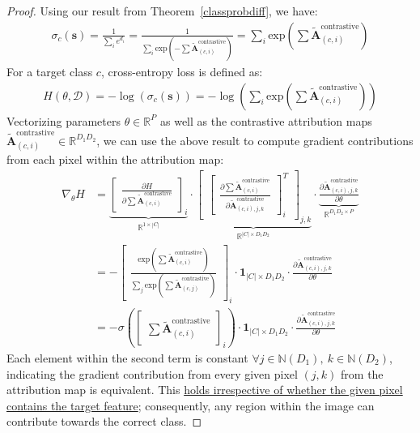 \documentclass{article}
\theoremstyle{plain}
\theoremstyle{definition}
\theoremstyle{remark}
\begin{document}
\begin{proof}
	Using our result from Theorem~\ref{classprobdiff}, we have:
	\begin{gather}
		\sigma_c(\bm{s}) = \frac{1}{\sum_i e^{d_i}} = \frac{1}{\sum_i \text{exp}({-\sum \tilde{\mathcal{\bm{A}}}^{\text{contrastive}}_{(c, i)}})} = \sum_i \text{exp}\left({\sum \tilde{\mathcal{\bm{A}}}^{\text{contrastive}}_{(c, i)}}\right)
	\end{gather}
	For a target class $c$, cross-entropy loss is defined as:
	\begin{gather}
		H(\theta, \mathcal{D}) = -\log \left( \sigma_c(\bm{s}) \right) = -\log \left( \sum_i \text{exp}\left({\sum \tilde{\mathcal{\bm{A}}}^{\text{contrastive}}_{(c, i)}}\right) \right)
	\end{gather}
	Vectorizing parameters $\theta \in \mathbb{R}^P$ as well as the contrastive attribution maps $\tilde{\mathcal{\bm{A}}}_{(c, i)}^{\text{contrastive}} \in \mathbb{R}^{D_1 D_2}$, we can use the above result to compute gradient contributions from each pixel within the attribution map:
	\begin{align}
		\nabla_\theta H &= \underbrace{\begin{bmatrix} \frac{\partial H}{\partial \sum \tilde{\mathcal{\bm{A}}}_{(c, i)}^{\text{contrastive}}} \end{bmatrix}_i}_{\mathbb{R}^{1 \times |C|}}
			\cdot \underbrace{\begin{bmatrix} \begin{bmatrix} \frac{\partial \sum \tilde{\mathcal{\bm{A}}}_{(c, i)}^{\text{contrastive}}}{\partial \tilde{\mathcal{\bm{A}}}_{(c, i), j, k}^{\text{contrastive}}} \end{bmatrix}_{i}^T \end{bmatrix}_{j,k}}_{\mathbb{R}^{|C| \times D_1 D_2}}
			\cdot \underbrace{\frac{\partial \tilde{\mathcal{\bm{A}}}_{(c, i), j, k}^{\text{contrastive}}}{\partial \theta}}_{\mathbb{R}^{D_1D_2 \times P}} \\
		&= - \begin{bmatrix} \frac{\text{exp}\left( \sum \tilde{\mathcal{\bm{A}}}^{\text{contrastive}}_{(c, i)}\right)}{\sum_j \text{exp}\left({\sum \tilde{\mathcal{\bm{A}}}^{\text{contrastive}}_{(c, j)}}\right)} \end{bmatrix}_i \cdot \bm{1}_{|C| \times D_1 D_2} \cdot \frac{\partial \tilde{\mathcal{\bm{A}}}_{(c, i), j, k}^{\text{contrastive}}}{\partial \theta} \\
			&= - \sigma\left( \begin{bmatrix} \sum \tilde{\mathcal{\bm{A}}}^{\text{contrastive}}_{(c, i)} \end{bmatrix}_i \right) \cdot \bm{1}_{|C| \times D_1 D_2} \cdot \frac{\partial \tilde{\mathcal{\bm{A}}}_{(c, i), j, k}^{\text{contrastive}}}{\partial \theta}
	\end{align}
	Each element within the second term is constant $\forall j \in \mathbb{N}(D_1),~k \in \mathbb{N}(D_2)$, indicating the gradient contribution from every given pixel $(j, k)$ from the attribution map is equivalent. This \underline{holds irrespective of whether the given pixel contains the target feature}; consequently, any region within the image can contribute towards the correct class.
\end{proof}
\end{document}
